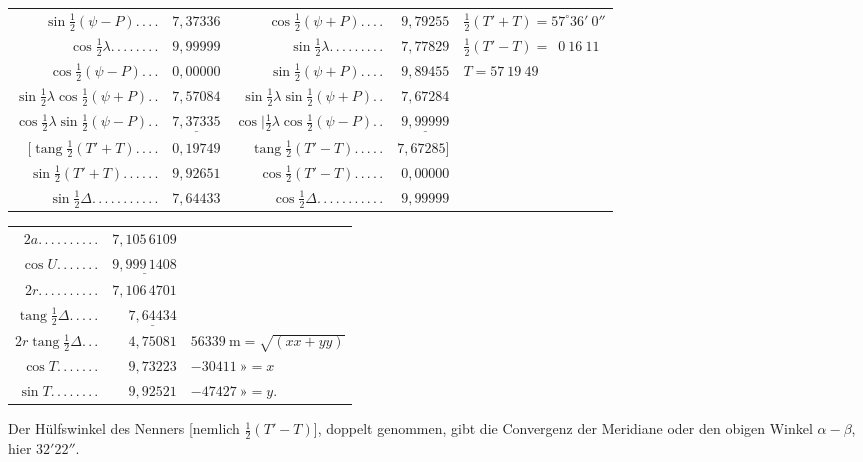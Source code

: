 \begin{center}
\begingroup\fontsize{8}{11}\selectfont\setlength{\tabcolsep}{3pt}\renewcommand{\arraystretch}{1.4}
\begin{tabular}{@{}r@{ }r@{\quad}r@{ }r@{\quad}l@{}}
$\sin\tfrac12(\psi-P).\,.\,.\,.$&$7{,}37336$&$\cos\tfrac12(\psi+P).\,.\,.\,.$&$9{,}79255$&$\tfrac12(T'+T)=57^\circ36'\ 0''$\\
$\cos\tfrac12\lambda.\,.\,.\,.\,.\,.\,.\,.$&$9{,}99999$&$\sin\tfrac12\lambda.\,.\,.\,.\,.\,.\,.\,.\,.$&$7{,}77829$&$\tfrac12(T'-T)=\phantom{5}0\ 16\ 11$\\
$\cos\tfrac12(\psi-P).\,.\,.$&$0{,}00000$&$\sin\tfrac12(\psi+P).\,.\,.\,.$&$9{,}89455$&$T=57\ 19\ 49$\\\cline{1-2}\cline{3-4}
$\sin\tfrac12\lambda\cos\tfrac12(\psi+P).\,.$&$7{,}57084$&$\sin\tfrac12\lambda\sin\tfrac12(\psi+P).\,.$&$7{,}67284$&\\
$\cos\tfrac12\lambda\sin\tfrac12(\psi-P).\,.$&$\underline{7{,}37335}$&$\cos\mathord{|}\tfrac12\lambda\cos\tfrac12(\psi-P).\,.$&$\underline{9{,}99999}$&\\
$[\operatorname{tang}\tfrac12(T'+T).\,.\,.\,.$&$0{,}19749$&$\operatorname{tang}\tfrac12(T'-T).\,.\,.\,.\,.$&$7{,}67285]$&\\
$\sin\tfrac12(T'+T).\,.\,.\,.\,.\,.$&$9{,}92651$&$\cos\tfrac12(T'-T).\,.\,.\,.\,.$&$0{,}00000$&\\
$\sin\tfrac12\Delta.\,.\,.\,.\,.\,.\,.\,.\,.\,.\,.$&$7{,}64433$&$\cos\tfrac12\Delta.\,.\,.\,.\,.\,.\,.\,.\,.\,.\,.$&$9{,}99999$&
\end{tabular}\par\endgroup
\end{center}
\begin{center}
\begingroup\small\renewcommand{\arraystretch}{1.15}
\begin{tabular}{r@{ }r@{\qquad}l}
$2a.\,.\,.\,.\,.\,.\,.\,.\,.\,.$&$7{,}105\,6109$&\\
$\cos U.\,.\,.\,.\,.\,.\,.$&$\underline{9{,}999\,1408}$&\\
$2r.\,.\,.\,.\,.\,.\,.\,.\,.\,.$&$7{,}106\,4701$&\\
$\operatorname{tang}\tfrac12\Delta.\,.\,.\,.\,.$&$\underline{7{,}64434}$&\\
$2r\operatorname{tang}\tfrac12\Delta.\,.\,.$&$4{,}75081$&$56339\ \mathrm m=\sqrt{(xx+yy)}$\\
$\cos T.\,.\,.\,.\,.\,.\,.$&$9{,}73223$&$-30411\ \text{»}=x$\\
$\sin T.\,.\,.\,.\,.\,.\,.\,.$&$9{,}92521$&$-47427\ \text{»}=y.$
\end{tabular}\par\endgroup
\end{center}
Der Hülfswinkel des Nenners [nemlich $\tfrac12(T'-T)$], doppelt genommen, gibt die Convergenz der Meridiane oder den obigen Winkel $\alpha-\beta$, hier $32'22''$.

